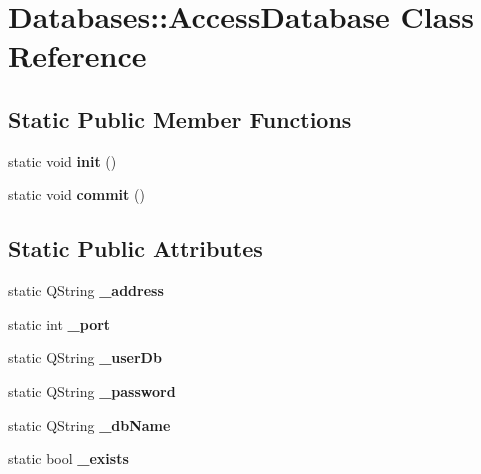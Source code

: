 \hypertarget{classDatabases_1_1AccessDatabase}{\section{Databases\-:\-:Access\-Database Class Reference}
\label{classDatabases_1_1AccessDatabase}
}
\subsection*{Static Public Member Functions}
\begin{DoxyCompactItemize}
\item 
\hypertarget{classDatabases_1_1AccessDatabase_a5a3df6b81283bbb9f25bf7a531f470ff}{static void {\bfseries init} ()}\label{classDatabases_1_1AccessDatabase_a5a3df6b81283bbb9f25bf7a531f470ff}

\item 
\hypertarget{classDatabases_1_1AccessDatabase_ac1a811b4c3d017665c95cc23740d90f9}{static void {\bfseries commit} ()}\label{classDatabases_1_1AccessDatabase_ac1a811b4c3d017665c95cc23740d90f9}

\end{DoxyCompactItemize}
\subsection*{Static Public Attributes}
\begin{DoxyCompactItemize}
\item 
\hypertarget{classDatabases_1_1AccessDatabase_a55d2effa9db8712ed59e1c812d0976a5}{static Q\-String {\bfseries \-\_\-address}}\label{classDatabases_1_1AccessDatabase_a55d2effa9db8712ed59e1c812d0976a5}

\item 
\hypertarget{classDatabases_1_1AccessDatabase_a3a0d5ea34848774e22513478bc8f2438}{static int {\bfseries \-\_\-port}}\label{classDatabases_1_1AccessDatabase_a3a0d5ea34848774e22513478bc8f2438}

\item 
\hypertarget{classDatabases_1_1AccessDatabase_ab8bce721fe627ad70763584d590c74f0}{static Q\-String {\bfseries \-\_\-user\-Db}}\label{classDatabases_1_1AccessDatabase_ab8bce721fe627ad70763584d590c74f0}

\item 
\hypertarget{classDatabases_1_1AccessDatabase_a8784a122fe511b200fd8e2fa1c327ac6}{static Q\-String {\bfseries \-\_\-password}}\label{classDatabases_1_1AccessDatabase_a8784a122fe511b200fd8e2fa1c327ac6}

\item 
\hypertarget{classDatabases_1_1AccessDatabase_a754d01d8f769d85e360f6a06380ff4a9}{static Q\-String {\bfseries \-\_\-db\-Name}}\label{classDatabases_1_1AccessDatabase_a754d01d8f769d85e360f6a06380ff4a9}

\item 
\hypertarget{classDatabases_1_1AccessDatabase_a4041377d9c32522f62a70d750d34e581}{static bool {\bfseries \-\_\-exists}}\label{classDatabases_1_1AccessDatabase_a4041377d9c32522f62a70d750d34e581}

\end{DoxyCompactItemize}


